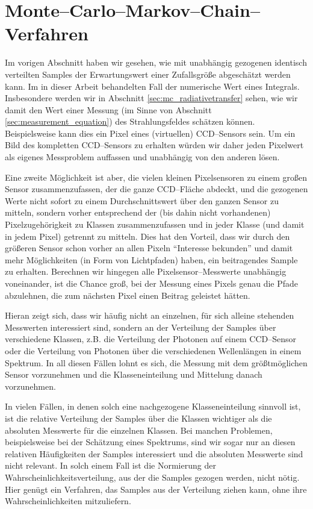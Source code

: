 	\chapter{Monte--Carlo--Markov--Chain--Verfahren}\label{chapter:mcmc}
	Im vorigen Abschnitt haben wir gesehen, wie mit unabhängig gezogenen identisch verteilten Samples der Erwartungswert einer Zufallsgröße abgeschätzt werden kann. Im in dieser Arbeit behandelten Fall der numerische Wert eines Integrals. Insbesondere werden wir in Abschnitt \ref{sec:mc_radiativetransfer} sehen, wie wir damit den Wert einer Messung (im Sinne von Abschnitt \ref{sec:measurement_equation}) des Strahlungsfeldes schätzen können. Beispielsweise kann dies ein Pixel eines (virtuellen) CCD--Sensors sein. Um ein Bild des kompletten CCD--Sensors zu erhalten würden wir daher jeden Pixelwert als eigenes Messproblem auffassen und unabhängig von den anderen lösen.
	
	Eine zweite Möglichkeit ist aber, die vielen kleinen Pixelsensoren zu einem großen Sensor zusammenzufassen, der die ganze CCD--Fläche abdeckt, und die gezogenen Werte nicht sofort zu einem Durchschnittswert über den ganzen Sensor zu mitteln, sondern vorher entsprechend der (bis dahin nicht vorhandenen) Pixelzugehörigkeit zu Klassen zusammenzufassen und in jeder Klasse (und damit in jedem Pixel) getrennt zu mitteln. Dies hat den Vorteil, dass wir durch den größeren Sensor schon vorher an allen Pixeln ``Interesse bekunden'' und damit mehr Möglichkeiten (in Form von Lichtpfaden) haben, ein beitragendes Sample zu erhalten. Berechnen wir hingegen alle Pixelsensor--Messwerte unabhängig voneinander, ist die Chance groß, bei der Messung eines Pixels genau die Pfade abzulehnen, die zum nächsten Pixel einen Beitrag geleistet hätten.
	
	Hieran zeigt sich, dass wir häufig nicht an einzelnen, für sich alleine stehenden Messwerten interessiert sind, sondern an der Verteilung der Samples über verschiedene Klassen, z.B. die Verteilung der Photonen auf einem CCD--Sensor oder die Verteilung von Photonen über die verschiedenen Wellenlängen in einem Spektrum. In all diesen Fällen lohnt es sich, die Messung mit dem größtmöglichen Sensor vorzunehmen und die Klasseneinteilung und Mittelung danach vorzunehmen.

	In vielen Fällen, in denen solch eine nachgezogene Klasseneinteilung sinnvoll ist, ist die relative Verteilung der Samples über die Klassen wichtiger als die absoluten Messwerte für die einzelnen Klassen. Bei manchen Problemen, beispielsweise bei der Schätzung eines Spektrums, sind wir sogar nur an diesen relativen Häufigkeiten der Samples interessiert und die absoluten Messwerte sind nicht relevant. In solch einem Fall ist die Normierung der Wahrscheinlichkeitsverteilung, aus der die Samples gezogen werden, nicht nötig. Hier genügt ein Verfahren, das Samples aus der Verteilung ziehen kann, ohne ihre Wahrscheinlichkeiten mitzuliefern.
	

